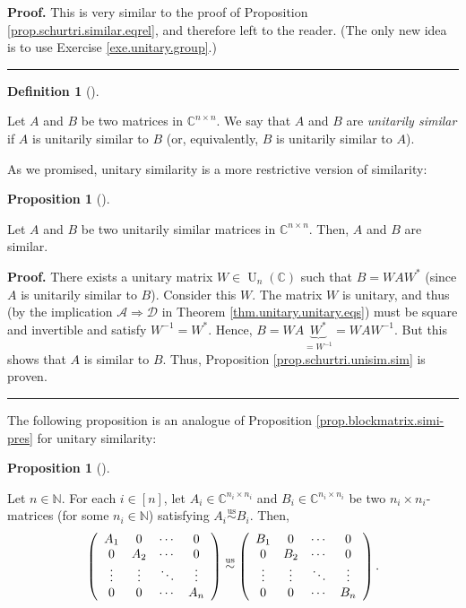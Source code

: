 \documentclass[numbers=enddot,12pt,final,onecolumn,notitlepage]{scrartcl}%
\numberwithin{exer}{subsection}
\theoremstyle{definition}
\newtheorem{prop}[theo]{Proposition}
\newenvironment{proposition}[1][]
{\begin{prop}[#1]\begin{leftbar}}
{\end{leftbar}\end{prop}}
\newtheorem{defi}[theo]{Definition}
\newenvironment{definition}[1][]
{\begin{defi}[#1]\begin{leftbar}}
{\end{leftbar}\end{defi}}
\newenvironment{proof}[1][Proof]{\noindent\textbf{#1.} }{\ \rule{0.5em}{0.5em}}
\begin{document}
\begin{proof}
This is very similar to the proof of Proposition
\ref{prop.schurtri.similar.eqrel}, and therefore left to the reader. (The only
new idea is to use Exercise \ref{exe.unitary.group}.)
\end{proof}

\begin{definition}
Let $A$ and $B$ be two matrices in $\mathbb{C}^{n\times n}$. We say that $A$
and $B$ are \emph{unitarily similar} if $A$ is unitarily similar to $B$ (or,
equivalently, $B$ is unitarily similar to $A$).
\end{definition}

As we promised, unitary similarity is a more restrictive version of similarity:

\begin{proposition}
\label{prop.schurtri.unisim.sim}Let $A$ and $B$ be two unitarily similar
matrices in $\mathbb{C}^{n\times n}$. Then, $A$ and $B$ are similar.
\end{proposition}

\begin{proof}
There exists a unitary matrix $W\in\operatorname*{U}\nolimits_{n}\left(
\mathbb{C}\right)  $ such that $B=WAW^{\ast}$ (since $A$ is unitarily similar
to $B$). Consider this $W$. The matrix $W$ is unitary, and thus (by the
implication $\mathcal{A}\Longrightarrow\mathcal{D}$ in Theorem
\ref{thm.unitary.unitary.eqs}) must be square and invertible and satisfy
$W^{-1}=W^{\ast}$. Hence, $B=WA\underbrace{W^{\ast}}_{=W^{-1}}=WAW^{-1}$. But
this shows that $A$ is similar to $B$. Thus, Proposition
\ref{prop.schurtri.unisim.sim} is proven.
\end{proof}

The following proposition is an analogue of Proposition
\ref{prop.blockmatrix.simi-pres} for unitary similarity:

\begin{proposition}
\label{prop.schurtri.block-unisimi}Let $n\in\mathbb{N}$. For each $i\in\left[
n\right]  $, let $A_{i}\in\mathbb{C}^{n_{i}\times n_{i}}$ and $B_{i}%
\in\mathbb{C}^{n_{i}\times n_{i}}$ be two $n_{i}\times n_{i}$-matrices (for
some $n_{i}\in\mathbb{N}$) satisfying $A_{i}\overset{\operatorname*{us}}{\sim
}B_{i}$. Then,%
\[
\left(
\begin{array}
[c]{cccc}%
A_{1} & 0 & \cdots & 0\\
0 & A_{2} & \cdots & 0\\
\vdots & \vdots & \ddots & \vdots\\
0 & 0 & \cdots & A_{n}%
\end{array}
\right)  \overset{\operatorname*{us}}{\sim}\left(
\begin{array}
[c]{cccc}%
B_{1} & 0 & \cdots & 0\\
0 & B_{2} & \cdots & 0\\
\vdots & \vdots & \ddots & \vdots\\
0 & 0 & \cdots & B_{n}%
\end{array}
\right)  .
\]

\end{proposition}
\end{document}
